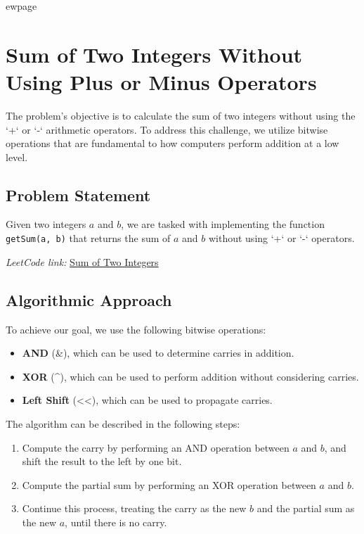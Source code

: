 
ewpage
\chapter{Sum of Two Integers Without Using Plus or Minus Operators}
\label{chap:sum_without_plus_minus}

The problem's objective is to calculate the sum of two integers without using the `+` or `-` arithmetic operators. To address this challenge, we utilize bitwise operations that are fundamental to how computers perform addition at a low level.

\section*{Problem Statement}

Given two integers $a$ and $b$, we are tasked with implementing the function \texttt{getSum(a, b)} that returns the sum of $a$ and $b$ without using `+` or `-` operators.

\textit{LeetCode link:} \href{https://leetcode.com/problems/sum-of-two-integers/}{Sum of Two Integers}

\section*{Algorithmic Approach}

To achieve our goal, we use the following bitwise operations:
\begin{itemize}
    \item \textbf{AND} (\&), which can be used to determine carries in addition.
    \item \textbf{XOR} (\textasciicircum), which can be used to perform addition without considering carries.
    \item \textbf{Left Shift} (<<), which can be used to propagate carries.
\end{itemize}

The algorithm can be described in the following steps:
\begin{enumerate}
    \item Compute the carry by performing an AND operation between $a$ and $b$, and shift the result to the left by one bit.
    \item Compute the partial sum by performing an XOR operation between $a$ and $b$.
    \item Continue this process, treating the carry as the new $b$ and the partial sum as the new $a$, until there is no carry.
\end{enumerate}


